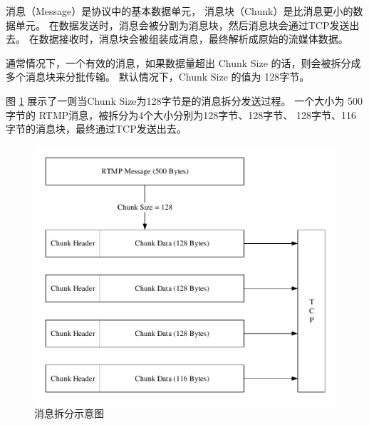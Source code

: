 消息（Message）是协议中的基本数据单元，
消息块（Chunk）是比消息更小的数据单元。
在数据发送时，消息会被分割为消息块，然后消息块会通过TCP发送出去。
在数据接收时，消息块会被组装成消息，最终解析成原始的流媒体数据。

通常情况下，一个有效的消息，如果数据量超出 Chunk Size 的话，则会被拆分成多个消息块来分批传输。
默认情况下，Chunk Size 的值为 128字节。

图 \ref{Fig:rtmp} 展示了一则当Chunk Size为128字节是的消息拆分发送过程。
一个大小为 500 字节的 RTMP消息，被拆分为4个大小分别为128字节、128字节、
128字节、116字节的消息块，最终通过TCP发送出去。

\begin{figure}[ht]
    \centering
    \includegraphics[width=1\linewidth]{./Figure/IMG_rtmp.pdf}
    \caption{消息拆分示意图}
    \label{Fig:rtmp}
\end{figure}


